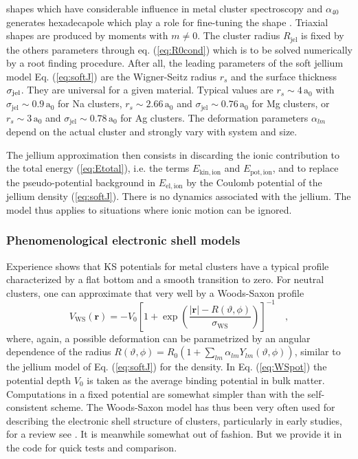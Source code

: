 \documentclass[final,1p]{elsarticle}
\begin{document}
shapes which have considerable influence in metal cluster spectroscopy
and $\alpha_{40}$ generates hexadecapole which play a role for
fine-tuning the shape \cite{Mon95b}.  Triaxial shapes are produced by
moments with $m\neq 0$. The cluster radius $R_\mathrm{jel}$ is fixed by
the others parameters through eq. (\ref{eq:R0cond}) which is to be
solved numerically by a root finding procedure.  After all, the
leading parameters of the soft jellium model Eq. (\ref{eq:softJ}) are
the Wigner-Seitz radius $r_s$ and the surface thickness $\sigma_{\rm
  jel}$.  They are universal for a given material. Typical values are
$r_s\sim 4\,\mathrm{a}_0$ with $\sigma_\mathrm{jel}\sim
0.9\,\mathrm{a}_0$ for Na clusters, $r_s\sim 2.66\,\mathrm{a}_0$ and
$\sigma_\mathrm{jel}\sim 0.76\,\mathrm{a}_0$ for {Mg clusters}, or
$r_s\sim 3\,\mathrm{a}_0$ and $\sigma_\mathrm{jel}\sim
0.78\,\mathrm{a}_0$ for Ag clusters. The deformation parameters
$\alpha_{lm}$ depend on the actual cluster and strongly vary with
system and size.


The jellium approximation then consists in discarding the ionic
contribution to the total energy (\ref{eq:Etotal}), i.e. the terms
$E_\mathrm{kin,ion}$ and $E_\mathrm{pot,ion}$, and to replace the
pseudo-potential background in $E_\mathrm{el,ion}$ by the Coulomb
potential of the jellium density (\ref{eq:softJ}). There is no
dynamics associated with the jellium. The model thus applies to
situations where ionic motion can be ignored.



\subsubsection{Phenomenological electronic shell models}
\label{eq:phenshell}

Experience shows that KS potentials for metal clusters have a typical
profile characterized by a flat bottom and a smooth transition to
zero. For neutral clusters, one can approximate that very well by a
Woods-Saxon profile
\begin{equation}
  V_\mathrm{WS}(\mathbf{r})
  =
  -V_0
  \left[1+
     \exp\left(\frac{|\mathbf{r}|-R(\vartheta,\phi)}
                    {\sigma_\mathrm{WS}}\right)
  \right]^{-1}
  \quad,
\label{eq:WSpot}
\end{equation}
where, again, a possible deformation can be parametrized by an angular
dependence of the radius
%
$R(\vartheta,\phi)=
R_0\left(1\!+\!\sum_{lm}\alpha_{lm}Y_{lm}(\vartheta,\phi)\right)$,
%
similar to the jellium model of Eq. (\ref{eq:softJ}) for the density.
In Eq. (\ref{eq:WSpot}) the potential depth $V_0$ is taken as the
average binding potential in bulk matter. Computations in a fixed
potential are somewhat simpler than with the self-consistent
scheme. The Woods-Saxon model has thus been very often used for
describing the electronic shell structure of clusters, particularly in
early studies, for a review see \cite{Bra93}. It is meanwhile somewhat
out of fashion. But we provide it in the code for quick tests and
comparison.
\end{document}
